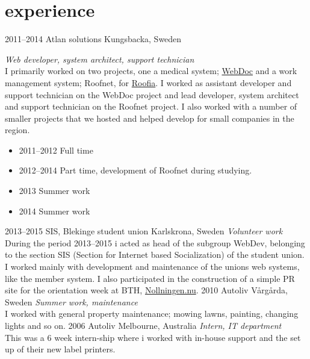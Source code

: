 \documentclass[]{friggeri-cv} %
\begin{document}

\section{experience}

\begin{entrylist}
\entry
{2011--2014}
{Atlan solutions}
{Kungsbacka, Sweden}
{\emph{Web developer, system architect, support technician} \\
I primarily worked on two projects, one a medical system; \href{http://atlan.se/}{WebDoc} and a work management system; Roofnet, for \href{http://www.roofia.se/}{Roofia}. I worked as assistant developer and support technician on the WebDoc project and lead developer, system architect and support technician on the Roofnet project. I also worked with a number of smaller projects that we hosted and helped develop for small companies in the region. \\
\begin{itemize}
	\item 2011--2012 Full time
	\item 2012--2014 Part time, development of Roofnet during studying.
	\item 2013 Summer work
	\item 2014 Summer work
\end{itemize}
}
\entry
{2013--2015}
{SIS, Blekinge student union}
{Karlskrona, Sweden}
{\emph{Volunteer work} \\
During the period 2013--2015 i acted as head of the subgroup WebDev, belonging to the section SIS (Section for Internet based Socialization) of the student union. I worked mainly with development and maintenance of the unions web systems, like the member system. I also participated in the construction of a simple PR site for the orientation week at BTH, \href{http://www.nollningen.nu}{Nollningen.nu}. }
\entry
{2010}
{Autoliv}
{Vårgårda, Sweden}
{\emph{Summer work, maintenance} \\
	I worked with general property maintenance; mowing lawns, painting, changing lights and so on. }
\entry
{2006}
{Autoliv}
{Melbourne, Australia}
{\emph{Intern, IT department} \\
This was a 6 week intern-ship where i worked with in-house support and the set up of their new label printers.}
\end{entrylist}
\end{document}
